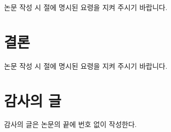 \documentclass[a4paper,twocolumn]{article}
\begin{document}
논문 작성 시 절에 명시된 요령을 지켜 주시기 바랍니다.

\section{결론}
\label{sec:conclusion}

논문 작성 시 절에 명시된 요령을 지켜 주시기 바랍니다.

\section*{감사의 글}

감사의 글은 논문의 끝에 번호 없이 작성한다.



\nocite{*}


\end{document}

